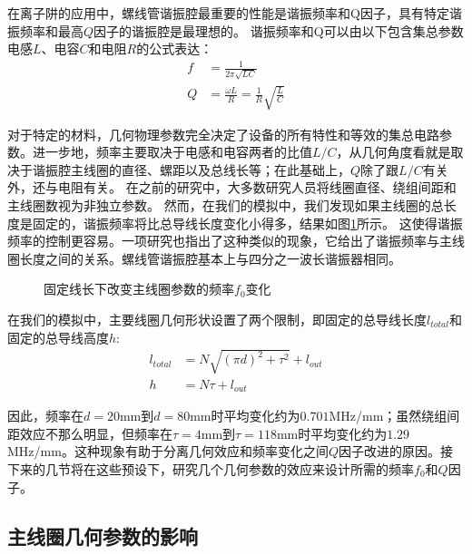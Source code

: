 在离子阱的应用中，螺线管谐振腔最重要的性能是谐振频率和Q因子，具有特定谐振频率和最高$Q$因子的谐振腔是最理想的\cite[]{Siverns_Simkins_Weidt_Hensinger_2012}。
谐振频率和Q可以由以下包含集总参数电感$L$、电容$C$和电阻$R$的公式表达：
\begin{align}
    f&=\frac{1}{2\pi\sqrt{LC}} \label{eq:helical_f_equation}\\
	Q&=\frac{\omega L}{R}=\frac{1}{R}\sqrt{\frac{L}{C}} \label{eq:helical_Q_equation}
\end{align}

对于特定的材料，几何物理参数完全决定了设备的所有特性和等效的集总电路参数。进一步地，频率主要取决于电感和电容两者的比值$L/C$，从几何角度看就是取决于谐振腔主线圈的直径、螺距以及总线长等；在此基础上，$Q$除了跟$L/C$有关外，还与电阻有关。
在之前的研究中，大多数研究人员将线圈直径、绕组间距和主线圈数视为非独立参数\cite[]{Siverns_Simkins_Weidt_Hensinger_2012,Macalpine_Schildknecht_1959}。
然而，在我们的模拟中，我们发现如果主线圈的总长度是固定的，谐振频率将比总导线长度变化小得多，结果如图\ref{fig:helical_fixedwirelength}所示。
这使得谐振频率的控制更容易。一项研究\cite[]{Nandi_Sikdar_Das_Ray_2022}也指出了这种类似的现象，它给出了谐振频率与主线圈长度之间的关系。螺线管谐振腔基本上与四分之一波长谐振器相同。
\begin{figure}
    \centering
    \caption[固定线长下改变主线圈参数的频率$f_0$变化]{固定线长下改变主线圈参数的频率$f_0$变化\label{fig:helical_fixedwirelength}}
\end{figure}

在我们的模拟中，主要线圈几何形状设置了两个限制，即固定的总导线长度$l_{total}$和固定的总导线高度$h$:
\begin{align}
    l_{total}&=N\sqrt{(\pi d)^2+\tau^2}+l_{out} \label{eq:helical_fixed_constraints_1}\\
	h&=N\tau+l_{out} \label{eq:helical_fixed_constraints_2}
\end{align}

因此，频率在$d=20 $mm到$d=80 $mm时平均变化约为$0.701$MHz/mm；虽然绕组间距效应不那么明显，但频率在$\tau=4 $mm到$\tau=118 $mm时平均变化约为$1.29$MHz/mm。这种现象有助于分离几何效应和频率变化之间$ Q $因子改进的原因。接下来的几节将在这些预设下，研究几个几何参数的效应来设计所需的频率$f_0$和$Q$因子。
\subsection[主线圈几何参数的影响]{主线圈几何参数的影响}

